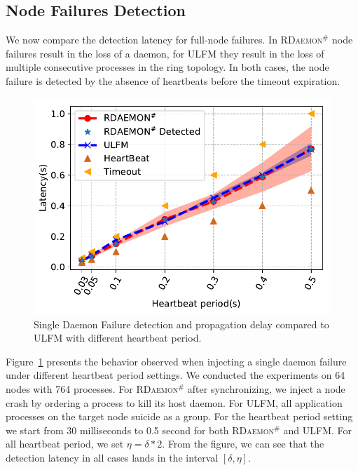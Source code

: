 \documentclass[sigconf]{acmart}
\newcommand{\ulfm}[0]{\textsc{ULFM}\xspace}
\newcommand{\ourwork}[0]{\textsc{RDaemon}\ensuremath{^\#}\xspace}
\begin{document}
\subsection{Node Failures Detection}
We now compare the detection latency for full-node failures. In \ourwork
node failures result in the loss of a daemon, for \ulfm they result in
the loss of multiple consecutive processes in the ring topology. In
both cases, the node failure is detected by the absence of heartbeats
before the timeout expiration.

\begin{figure}[h]
  \centering
  \includegraphics[width=\linewidth]{PRRTE_ULFM_comparision.pdf}
  \caption{Single Daemon Failure detection and propagation delay compared to \ulfm with different heartbeat period.}
  \label{fig:node_failure_hb}
\end{figure}

Figure~\ref{fig:node_failure_hb} presents the behavior observed when injecting a single daemon failure under different heartbeat period settings. We conducted the experiments on 64 nodes with 764 processes. For \ourwork after synchronizing, we inject a node crash by ordering a process to kill its host daemon. For \ulfm,
all application processes on the target node suicide as a group.
For the heartbeat period setting we start from 30 milliseconds to 0.5 second for both \ourwork and \ulfm. For all heartbeat period, we set $ \eta = \delta * 2 $. From the figure, we can see that the detection latency in all cases lands in the interval $[\delta,\eta]$.
\end{document}
